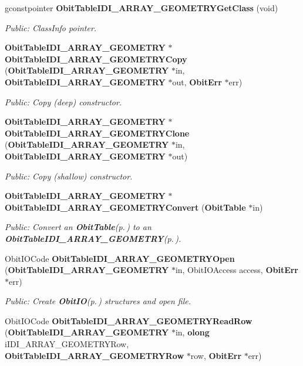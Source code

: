 \begin{CompactItemize}
gconstpointer {\bf Obit\-Table\-IDI\_\-ARRAY\_\-GEOMETRYGet\-Class} (void)
\begin{CompactList}\small\item\em Public: Class\-Info pointer. \item\end{CompactList}\item 
{\bf Obit\-Table\-IDI\_\-ARRAY\_\-GEOMETRY} $\ast$ {\bf Obit\-Table\-IDI\_\-ARRAY\_\-GEOMETRYCopy} ({\bf Obit\-Table\-IDI\_\-ARRAY\_\-GEOMETRY} $\ast$in, {\bf Obit\-Table\-IDI\_\-ARRAY\_\-GEOMETRY} $\ast$out, {\bf Obit\-Err} $\ast$err)
\begin{CompactList}\small\item\em Public: Copy (deep) constructor. \item\end{CompactList}\item 
{\bf Obit\-Table\-IDI\_\-ARRAY\_\-GEOMETRY} $\ast$ {\bf Obit\-Table\-IDI\_\-ARRAY\_\-GEOMETRYClone} ({\bf Obit\-Table\-IDI\_\-ARRAY\_\-GEOMETRY} $\ast$in, {\bf Obit\-Table\-IDI\_\-ARRAY\_\-GEOMETRY} $\ast$out)
\begin{CompactList}\small\item\em Public: Copy (shallow) constructor. \item\end{CompactList}\item 
{\bf Obit\-Table\-IDI\_\-ARRAY\_\-GEOMETRY} $\ast$ {\bf Obit\-Table\-IDI\_\-ARRAY\_\-GEOMETRYConvert} ({\bf Obit\-Table} $\ast$in)
\begin{CompactList}\small\item\em Public: Convert an {\bf Obit\-Table}{\rm (p.\,\pageref{structObitTable})} to an {\bf Obit\-Table\-IDI\_\-ARRAY\_\-GEOMETRY}{\rm (p.\,\pageref{structObitTableIDI__ARRAY__GEOMETRY})}. \item\end{CompactList}\item 
Obit\-IOCode {\bf Obit\-Table\-IDI\_\-ARRAY\_\-GEOMETRYOpen} ({\bf Obit\-Table\-IDI\_\-ARRAY\_\-GEOMETRY} $\ast$in, Obit\-IOAccess access, {\bf Obit\-Err} $\ast$err)
\begin{CompactList}\small\item\em Public: Create {\bf Obit\-IO}{\rm (p.\,\pageref{structObitIO})} structures and open file. \item\end{CompactList}\item 
Obit\-IOCode {\bf Obit\-Table\-IDI\_\-ARRAY\_\-GEOMETRYRead\-Row} ({\bf Obit\-Table\-IDI\_\-ARRAY\_\-GEOMETRY} $\ast$in, {\bf olong} i\-IDI\_\-ARRAY\_\-GEOMETRYRow, {\bf Obit\-Table\-IDI\_\-ARRAY\_\-GEOMETRYRow} $\ast$row, {\bf Obit\-Err} $\ast$err)

\end{CompactItemize}
